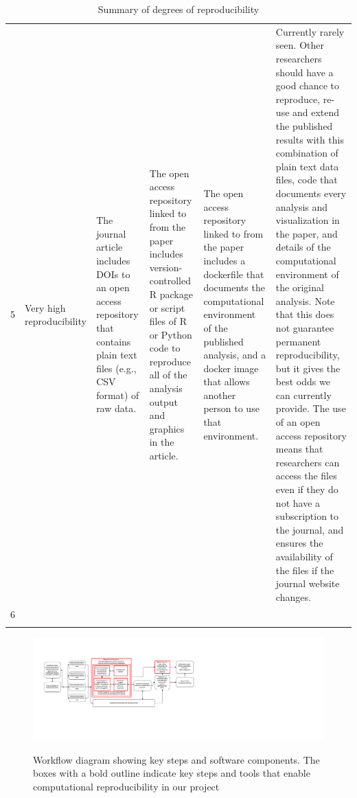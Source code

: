 \documentclass[american,man]{apa6}
\begin{document}
\begin{landscape}
{\begin{longtable}{lp{2cm}p{5cm}p{5cm}p{5cm}p{5cm}}
  5 & Very high reproducibility & The journal article includes DOIs to an open access repository that contains plain text files (e.g., CSV format) of raw data. & The open access repository linked to from the paper includes version-controlled R package or script files of R or Python code to reproduce all of the analysis output and graphics in the article. & The open access repository linked to from the paper includes a dockerfile that documents the computational environment of the published analysis, and a docker image that allows another person to use that environment. & Currently rarely seen. Other researchers should have a good chance to reproduce, re-use and extend the published results with this combination of plain text data files, code that documents every analysis and visualization in the paper, and details of the computational environment of the original analysis. Note that this does not guarantee permanent reproducibility, but it gives the best odds we can currently provide. The use of an open access repository means that researchers can access the files even if they do not have a subscription to the journal, and ensures the availability of the files if the journal website changes.  \\ 
  6 &  &  &  &  &  \\ 
   \bottomrule
\caption{Summary of degrees of reproducibility} 
\end{longtable}
}

\end{landscape}

\begin{figure}[h!]
  \caption{Workflow diagram showing key steps and software components. The boxes with a bold outline indicate key steps and tools that enable computational reproducibility in our project}
  \centering
\includegraphics[width=\textwidth]{../figures/figure_workflow.pdf}
\label{fig:workflow}
\end{figure}

\newpage
\end{document}
